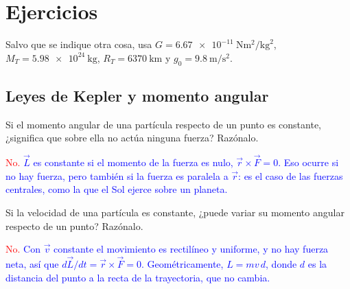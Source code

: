 
\section{Ejercicios}\label{sec:grav-ejercicios}

Salvo que se indique otra cosa, usa \(G = \qty{6.67e-11}{\newton\m\squared\per\kg\squared}\), \(M_T = \qty{5.98e24}{\kg}\),
\(R_T = \qty{6370}{\km}\) y \(g_0 = \qty{9.8}{\m\per\second\squared}\).

\subsection{Leyes de Kepler y momento angular}

\begin{exercise}
    Si el momento angular de una partícula respecto de un punto es constante, ¿significa que sobre ella no actúa ninguna
    fuerza? Razónalo.
    \begin{solu}
        \textcolor{red}{No.} \textcolor{blue}{\(\vec L\) es constante si el momento de la fuerza es nulo, \(\vec r\times\vec F = 0\). Eso ocurre si
        no hay fuerza, pero también si la fuerza es paralela a \(\vec r\): es el caso de las fuerzas centrales, como la que el Sol
        ejerce sobre un planeta.}
    \end{solu}
\end{exercise}

\begin{exercise}
    Si la velocidad de una partícula es constante, ¿puede variar su momento angular respecto de un punto? Razónalo.
    \begin{solu}
        \textcolor{red}{No.} \textcolor{blue}{Con \(\vec v\) constante el movimiento es rectilíneo y uniforme, y no hay fuerza neta, así que
        \(d\vec L/dt = \vec r\times\vec F = 0\). Geométricamente, \(L = m v\,d\), donde \(d\) es la distancia del punto a la recta de
        la trayectoria, que no cambia.}
    \end{solu}
\end{exercise}

